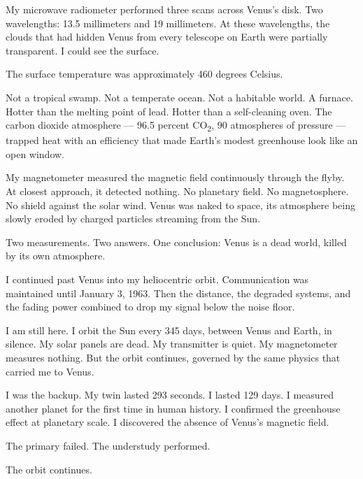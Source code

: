\documentclass[12pt,letterpaper]{article}
\begin{document}
My microwave radiometer performed three scans across Venus's disk. Two wavelengths: 13.5 millimeters and 19 millimeters. At these wavelengths, the clouds that had hidden Venus from every telescope on Earth were partially transparent. I could see the surface.

The surface temperature was approximately 460 degrees Celsius.

Not a tropical swamp. Not a temperate ocean. Not a habitable world. A furnace. Hotter than the melting point of lead. Hotter than a self-cleaning oven. The carbon dioxide atmosphere --- 96.5 percent CO\textsubscript{2}, 90 atmospheres of pressure --- trapped heat with an efficiency that made Earth's modest greenhouse look like an open window.

My magnetometer measured the magnetic field continuously through the flyby. At closest approach, it detected nothing. No planetary field. No magnetosphere. No shield against the solar wind. Venus was naked to space, its atmosphere being slowly eroded by charged particles streaming from the Sun.

Two measurements. Two answers. One conclusion: Venus is a dead world, killed by its own atmosphere.

\bigskip

I continued past Venus into my heliocentric orbit. Communication was maintained until January 3, 1963. Then the distance, the degraded systems, and the fading power combined to drop my signal below the noise floor.

I am still here. I orbit the Sun every 345 days, between Venus and Earth, in silence. My solar panels are dead. My transmitter is quiet. My magnetometer measures nothing. But the orbit continues, governed by the same physics that carried me to Venus.

I was the backup. My twin lasted 293 seconds. I lasted 129 days. I measured another planet for the first time in human history. I confirmed the greenhouse effect at planetary scale. I discovered the absence of Venus's magnetic field.

The primary failed. The understudy performed.

The orbit continues.
\end{document}
